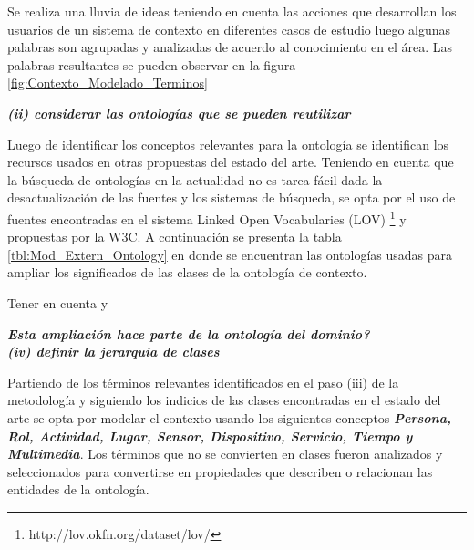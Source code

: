 Se realiza una lluvia de ideas teniendo en cuenta las acciones que desarrollan los usuarios de un sistema de contexto en diferentes casos de estudio luego algunas palabras son agrupadas y analizadas de acuerdo al conocimiento en el área. Las palabras resultantes se pueden observar en la figura \ref{fig:Contexto_Modelado_Terminos}


\textbf{\textit{(ii) considerar las ontologías que se pueden reutilizar}}

Luego de identificar los conceptos relevantes para la ontología se identifican los recursos usados en otras propuestas del estado del arte. Teniendo en cuenta que la búsqueda de ontologías en la actualidad no es tarea fácil dada la desactualización de las fuentes y los sistemas de búsqueda, se opta por el uso de fuentes encontradas en el sistema Linked Open Vocabularies (LOV) \footnote{http://lov.okfn.org/dataset/lov/} y propuestas por la W3C. A continuación se presenta la tabla \ref{tbl:Mod_Extern_Ontology} en donde se encuentran las ontologías usadas para ampliar los significados de las clases de la ontología de contexto.

Tener en cuenta y %







\textit{\textbf{Esta ampliación hace parte de la ontología del dominio?}}\\


\textbf{\textit{(iv) definir la jerarquía de clases}}

Partiendo de los términos relevantes identificados en el paso (iii) de la metodología y siguiendo los indicios de las clases encontradas en el estado del arte se opta por modelar el contexto usando los siguientes conceptos \textbf{\textit{Persona, Rol, Actividad, Lugar, Sensor, Dispositivo, Servicio, Tiempo y Multimedia}}. Los términos que no se convierten en clases fueron analizados y seleccionados para convertirse en propiedades que describen o relacionan las entidades de la ontología.

